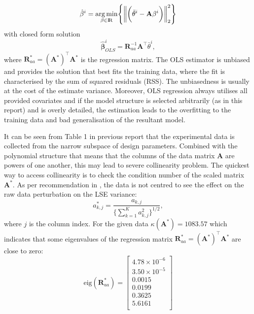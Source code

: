 \documentclass[a4paper,11pt,twoside]{article}
\newcommand{\norm}[1]{\left\lVert#1\right\rVert}
\DeclareMathOperator{\R}{\rm I\!R}
\theoremstyle{mytheoremstyle}
\begin{document}
\begin{equation}
\hat{\mathbf{\beta}}^i = \underset{\beta \in \R}{\arg \min} \Biggl\{\norm{ \biggl(\bar{\theta}^i - \mathbf{A} \mathbf{\beta}^i \biggr) }^{2}_{2}\Biggr\}
\end{equation}
with closed form solution
\begin{equation}
\hat{\mathbf{\beta}}^{i}_{OLS} = \mathbf{R}^{-1}_{aa} \mathbf{A}^{\top}\bar{\theta}^i,  
\end{equation} 
where $\mathbf{R}^{\ast}_{aa} = (\mathbf{A}^\ast)^{\top}\mathbf{A}^\ast$ is the regression matrix. The OLS estimator is unbiased and provides the solution that best fits the training data, where the fit is characterised by the sum of squared residuals (RSS). The unbiasedness is usually at the cost of the estimate variance. Moreover, OLS regression always utilises all provided covariates and if the model structure is selected arbitrarily (as in this report) and is overly detailed, the estimation leads to the overfitting to the training data and bad generalisation of the resultant model.
\par It can be seen from Table 1 in previous report that the experimental data is collected from the narrow subspace of design parameters. Combined with the polynomial structure that means that the columns of the data matrix $\mathbf{A} $ are powers of one another, this may lead to severe collinearity problem. The quickest way to access collinearity is to check the condition number of the scaled matrix $\mathbf{A}^\ast$. As per recommendation in \cite{Seber2003}, the data is not centred to see the effect on the raw data perturbation on the LSE variance:
\begin{equation*}
a^{\ast}_{k,j} = \frac{a_{k,j}}{\Big\{ \sum^{K}_{k=1} a^{2}_{k,j}\Big\}^{1/2}}, 
\end{equation*}
where $j$ is the column index.
For the given data $\kappa(\mathbf{A}^\ast) = 1083.57$ which indicates that some eigenvalues of the regression matrix $\mathbf{R}^{\ast}_{aa} = (\mathbf{A}^\ast)^{\top}\mathbf{A}^\ast$ are close to zero:
\begin{equation*}
\text{eig}(\mathbf{R}^{\ast}_{aa}) = \left[\begin{array}{r}
4.78 \times 10^{-6} \\
3.50 \times 10^{-5} \\
0.0015	\\
0.0199	\\
0.3625	\\
5.6161	\\
\end{array}\right]
\end{equation*}
\end{document}
